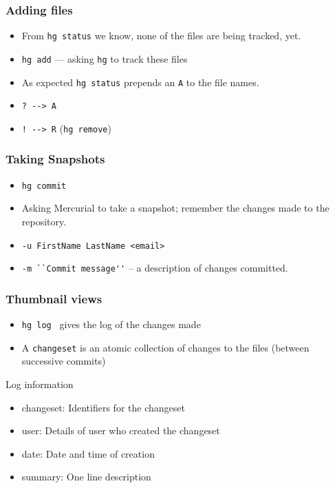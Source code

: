 \documentclass[14pt,compress]{beamer}
\newcounter{time}
\newcommand{\typ}[1]{\lstinline{#1}}
\begin{document}
\begin{frame}
  \frametitle{Adding files}
  \begin{itemize}
  \item From \typ{hg status} we know, none of the files are being
    tracked, yet. 
  \item \typ{hg add} --- asking \typ{hg} to track these files
  \item As expected \typ{hg status} prepends an \typ{A} to the file
  names.
  \item \typ{? --> A} 
  \item \typ{! --> R} (\typ{hg remove})
  \end{itemize}
\end{frame}

\begin{frame}
  \frametitle{Taking Snapshots}
  \begin{itemize}
  \item \typ{hg commit}
  \item Asking Mercurial to take a snapshot; remember the changes made
    to the repository. 
  \item \typ{-u FirstName LastName <email>}
  \item \typ{-m ``Commit message''} -- a description of changes committed. 
  \end{itemize}
\end{frame}

\begin{frame}
  \frametitle{Thumbnail views}
  \begin{itemize}
  \item \typ{hg log}~ gives the log of the changes made
  \item A \typ{changeset} is an atomic collection of changes to the
    files (between successive commits)
  \end{itemize}
  \begin{block}{Log information}
    \begin{itemize}
    \item \alert{changeset}: Identifiers for the changeset
    \item \alert{user}: Details of user who created the changeset
    \item \alert{date}: Date and time of creation
    \item \alert{summary}: One line description
    \end{itemize}    
  \end{block}
\end{frame}
\end{document}
